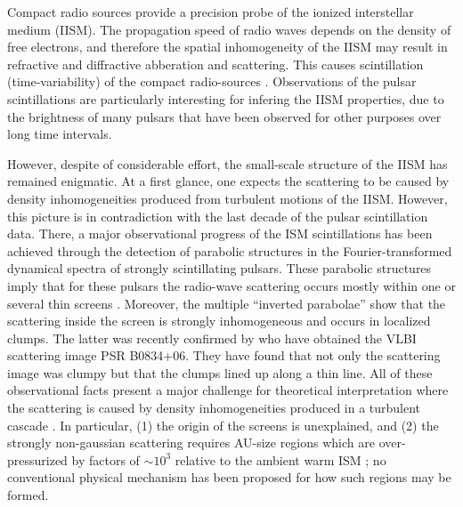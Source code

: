 \documentclass[useAMS,usenatbib]{mn2e}
\begin{document}
Compact radio sources provide a precision probe of the ionized interstellar medium
(IISM).  The propagation speed of radio waves depends on the density
of free electrons, and therefore the spatial inhomogeneity of the IISM may result in refractive and diffractive
abberation and scattering. This causes scintillation (time-variability) of the compact radio-sources
 \citep{1968Natur.218..920S,1986ApJ...301L..53B,2006ApJS..165..439R}. 
Observations of the pulsar scintillations are particularly interesting for infering the IISM properties, 
due to the brightness of many pulsars that have been observed for other purposes over long time intervals.

However, despite of considerable effort, the small-scale structure of the IISM
has remained enigmatic. At a first glance, one expects the scattering to be caused by density
inhomogeneities produced from turbulent motions of the IISM. However, this picture
is in contradiction with the last decade of the pulsar scintillation data.   There, a
major observational progress of the ISM scintillations has been
achieved through the \citet{2001ApJ...549L..97S}
detection of parabolic structures in the Fourier-transformed dynamical
spectra of strongly scintillating pulsars. These parabolic structures
imply that for these pulsars the radio-wave scattering occurs mostly
within one or several thin screens
\citep{2004MNRAS.354...43W,2006ApJ...637..346C,2008MNRAS.388.1214W}.
Moreover, the multiple ``inverted
parabolae'' \citep{2005ApJ...619L.171H} show that the scattering
inside the screen is strongly inhomogeneous and occurs in
localized clumps. The latter was recently confirmed by \cite{2010ApJ...708..232B} who have obtained the VLBI scattering
image PSR B0834+06. They
have found that not only the scattering image was clumpy but that the
clumps lined up along a thin line.
All of these
observational facts present a major challenge for theoretical
interpretation where the scattering is caused by density inhomogeneities produced in a turbulent
cascade \citep{2001ApJ...562..279L}. In particular, (1) the origin of the screens is unexplained,
and (2) the strongly non-gaussian scattering requires AU-size
regions which are over-pressurized by factors of $\sim 10^3$
relative to the ambient warm ISM \citep{1987Natur.328..324R}; no conventional
physical mechanism has been proposed for how such regions may be
formed.
\end{document}
